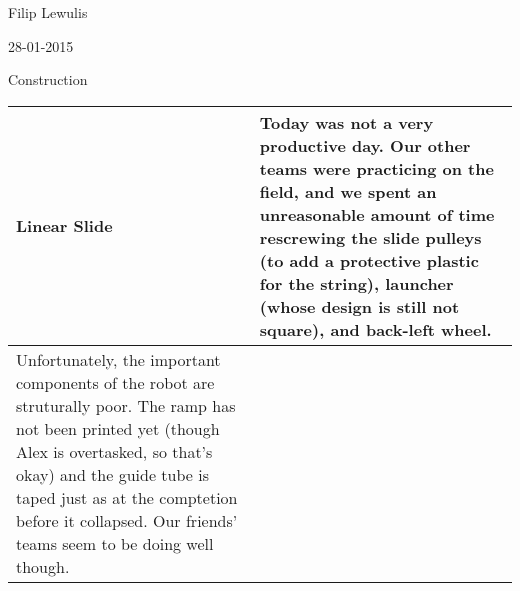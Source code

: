 Filip Lewulis

28-01-2015

Construction

\begin{tabular}{|p{5cm}|p{5cm}|}
\hline Linear Slide &
Today was not a very productive day. Our other teams were practicing on the field, and we spent an unreasonable amount of time rescrewing the slide pulleys (to add a protective plastic for the string), launcher (whose design is still not square), and back-left wheel.\\
\hline
Unfortunately, the important components of the robot are struturally poor. The ramp has not been printed yet (though Alex is overtasked, so that's okay) and the guide tube is taped just as at the comptetion before it collapsed. Our friends' teams seem to be doing well though.
\end{tabular}
